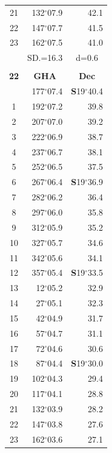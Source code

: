 \documentclass[10pt, a4paper]{report}
\begin{document}
\begin{scriptsize}
\begin{tabular*}{0.2\textwidth}[t]{@{\extracolsep{\fill}}|c|rr|}
21 & 132$^\circ$07.9 & \raisebox{0.24ex}{\boldmath$\cdot$~\boldmath$\cdot$~~}42.1\\
22 & 147$^\circ$07.7 & 41.5\\
23 & 162$^\circ$07.5 & 41.0\\
\hline
\rule{0pt}{2.4ex} & \multicolumn{1}{c}{SD.=16.3} & \multicolumn{1}{c|}{d=0.6}\\
\hline
\multicolumn{1}{c}{}\\[-0.5ex]\hline
\multicolumn{1}{|c|}{\rule{0pt}{2.6ex}\textbf{22}} & \multicolumn{1}{c}{\textbf{GHA}} & \multicolumn{1}{c|}{\textbf{Dec}}\\
\hline\rule{0pt}{2.6ex}\noindent
0 & 177$^\circ$07.4 & \textbf{S}19$^\circ$40.4\\
1 & 192$^\circ$07.2 & 39.8\\
2 & 207$^\circ$07.0 & 39.2\\
3 & 222$^\circ$06.9 & \raisebox{0.24ex}{\boldmath$\cdot$~\boldmath$\cdot$~~}38.7\\
4 & 237$^\circ$06.7 & 38.1\\
5 & 252$^\circ$06.5 & 37.5\\[2Pt]
6 & 267$^\circ$06.4 & \textbf{S}19$^\circ$36.9\\
7 & 282$^\circ$06.2 & 36.4\\
8 & 297$^\circ$06.0 & 35.8\\
9 & 312$^\circ$05.9 & \raisebox{0.24ex}{\boldmath$\cdot$~\boldmath$\cdot$~~}35.2\\
10 & 327$^\circ$05.7 & 34.6\\
11 & 342$^\circ$05.6 & 34.1\\[2Pt]
12 & 357$^\circ$05.4 & \textbf{S}19$^\circ$33.5\\
13 & 12$^\circ$05.2 & 32.9\\
14 & 27$^\circ$05.1 & 32.3\\
15 & 42$^\circ$04.9 & \raisebox{0.24ex}{\boldmath$\cdot$~\boldmath$\cdot$~~}31.7\\
16 & 57$^\circ$04.7 & 31.1\\
17 & 72$^\circ$04.6 & 30.6\\[2Pt]
18 & 87$^\circ$04.4 & \textbf{S}19$^\circ$30.0\\
19 & 102$^\circ$04.3 & 29.4\\
20 & 117$^\circ$04.1 & 28.8\\
21 & 132$^\circ$03.9 & \raisebox{0.24ex}{\boldmath$\cdot$~\boldmath$\cdot$~~}28.2\\
22 & 147$^\circ$03.8 & 27.6\\
23 & 162$^\circ$03.6 & 27.1\\

\end{tabular*}
\end{scriptsize}
\end{document}
